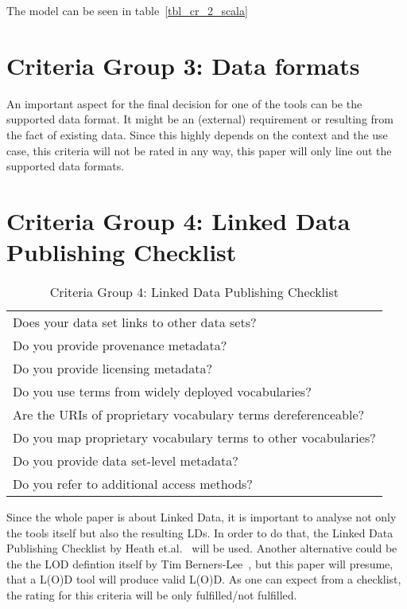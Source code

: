 The model can be seen in table~\ref{tbl_cr_2_scala}

\section{Criteria Group 3: Data formats}

An important aspect for the final decision for one of the tools can be the supported data format. It might be an (external) requirement or resulting from the fact of existing data. Since this highly depends on the context and the use case, this criteria will not be rated in any way, this paper will only line out the supported data formats.

\section{Criteria Group 4: Linked Data Publishing Checklist}

\begin{table}[htb]
\centering
\begin{tabular}{|l|}
\rowcolor[HTML]{EFEFEF} 
\hline
\multicolumn{1}{|c|}{\textbf{Criteria}}                        \\ \hline
Does your data set links to other data sets?                   \\ \hline
Do you provide provenance metadata?                            \\ \hline
Do you provide licensing metadata?                             \\ \hline
Do you use terms from widely deployed vocabularies?            \\ \hline
Are the URIs of proprietary vocabulary terms dereferenceable?  \\ \hline
Do you map proprietary vocabulary terms to other vocabularies? \\ \hline
Do you provide data set-level metadata?                        \\ \hline
Do you refer to additional access methods?                     \\ \hline
\end{tabular}
\caption{Criteria Group 4: Linked Data Publishing Checklist}
\label{tbl_cr_4_scala}
\end{table}

Since the whole paper is about Linked Data, it is important to analyse not only the tools itself but also the resulting LDs. In order to do that, the Linked Data Publishing Checklist by Heath et.al.~\cite{heath2011linked} will be used. Another alternative could be the the LOD defintion itself by Tim Berners-Lee~\cite{berners2006linked}, but this paper will presume, that a L(O)D tool will produce valid L(O)D. As one can expect from a checklist, the rating for this criteria will be only fulfilled/not fulfilled.

